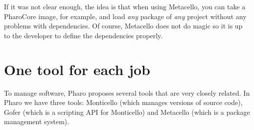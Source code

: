 \documentclass[a4paper,10pt,twoside]{book}
\begin{document}
If it was not clear enough, the idea is that when using Metacello, you can take a PharoCore image, for example, and load {\em any} package of {\em any} project without any problems with dependencies. Of course, Metacello does not do magic so it is up to the developer  to define the dependencies properly.


\section{One tool for each job}

To manage software, Pharo proposes several tools that are very closely related. In Pharo we have three tools: Monticello (which manages versions of source code), Gofer (which is a scripting API for Monticello) and Metacello (which is a package management system).


\end{document}
